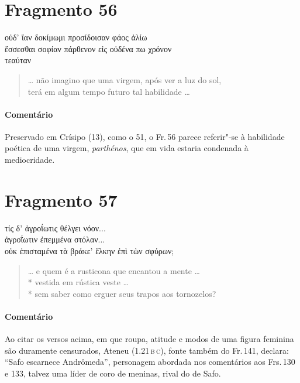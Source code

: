 \pagebreak
\section{Fragmento 56}

\begin{gkverse}
οὐδ’ ἴαν δοκίμωμι προσίδοισαν φάος ἀλίω\\
ἔσσεσθαι σοφίαν πάρθενον εἰς οὐδένα πω χρόνον\\
τεαύταν
\end{gkverse}

\begin{verse}
\ldots{} não imagino que uma virgem, após ver a luz do sol,\\
terá em algum tempo futuro tal habilidade \ldots{}
\end{verse}

\medskip

{\paragraph{Comentário} Preservado em Crísipo (13), como o 51, o Fr.\,56 parece referir"-se à habilidade
poética de uma virgem, \textit{parthénos}, que em vida estaria condenada à
mediocridade.}


\section{Fragmento 57}

\begin{gkverse}
τίς δ’ ἀγροΐωτις θέλγει νόον...\\
ἀγροΐωτιν ἐπεμμένα στόλαν...\\
οὐκ ἐπισταμένα τὰ βράκε’ ἔλκην ἐπὶ τὼν σφύρων;
\end{gkverse}

\begin{verse}
\ldots{} e quem é a rusticona que encantou a mente \ldots{}\\*
vestida em rústica veste \ldots{}\\*
sem saber como erguer seus trapos aos tornozelos?
\end{verse}

\medskip

{\paragraph{Comentário} Ao citar os versos acima, em que roupa, atitude e modos de uma figura feminina são
duramente censurados, Ateneu (1.21\,\textsc{b}\,\textsc{c}), fonte também do Fr.\,141, declara: ``Safo
escarnece Andrômeda'', personagem abordada nos comentários aos Frs.\,130 e 133, talvez uma líder de coro de meninas, rival do de Safo.}


